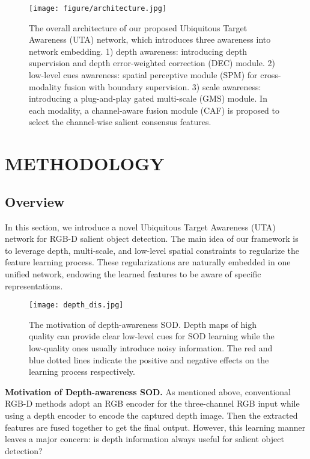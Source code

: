 \documentclass[journal]{IEEEtran}
\begin{document}
\begin{figure*}
	\begin{center}
\texttt{[image: figure/architecture.jpg]}
		\caption{The overall architecture of our proposed Ubiquitous Target Awareness (UTA) network, which introduces three awareness into network embedding. 1) depth awareness: introducing depth supervision and depth error-weighted correction (DEC) module. 2) low-level cues awareness: spatial perceptive module (SPM) for cross-modality fusion with boundary supervision. 3) scale awareness: introducing a plug-and-play gated multi-scale (GMS) module. In each modality, a channel-aware fusion module (CAF) is proposed to select the channel-wise salient consensus features.
		}\label{fig:architecture}
	\end{center}
\end{figure*}

\section{METHODOLOGY}\label{sec:method}
\subsection{Overview}
In this section, we introduce a novel Ubiquitous Target Awareness (UTA) network for RGB-D salient object detection. The main idea of our framework is to leverage depth, multi-scale, and low-level spatial constraints to regularize the feature learning process. These regularizations are naturally embedded in one unified network, endowing the learned features to be aware of specific representations.

\begin{figure}[t]
	\begin{center}
\texttt{[image: depth\_dis.jpg]}
		\caption{The motivation of depth-awareness SOD. Depth maps of high quality can provide clear low-level cues for SOD learning while the low-quality ones usually introduce noisy information. The red and blue dotted lines indicate the positive and negative effects on the learning process respectively.
		}\label{fig:depth_dis}
	\end{center}
\end{figure}



\textbf{Motivation of Depth-awareness SOD.} As mentioned above, conventional RGB-D methods adopt an RGB encoder for the three-channel RGB input while using a depth encoder to encode the captured depth image. Then the extracted features are fused together to get the final output. However, this learning manner leaves a major concern: is depth information always useful for salient object detection?
\end{document}
